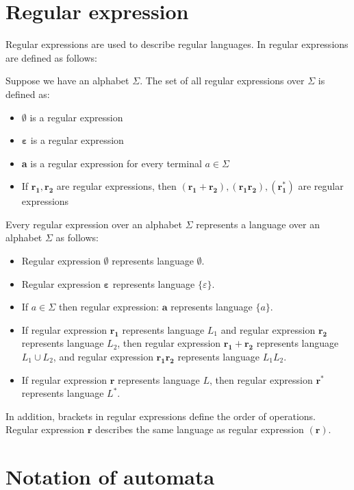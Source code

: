 \documentclass{ctuthesis}
\begin{document}
\section{Regular expression}
\label{sec:regex-def}
Regular expressions are used to describe regular languages. In \cite{demlova} regular expressions are defined as follows:

Suppose we have an alphabet $\Sigma$. The set of all regular expressions over $\Sigma$ is defined as:
\begin{itemize}
	\item $\mathbf{\emptyset}$ is a regular expression
	\item $\mathbf{\varepsilon}$ is a regular expression
	\item \textbf{a} is a regular expression for every terminal $a \in \Sigma$
	\item If $\mathbf{r_1}, \mathbf{r_2}$ are regular expressions, then $(\mathbf{r_1+r_2}), (\mathbf{r_1r_2}), (\mathbf{r_1^*})$ are regular expressions
\end{itemize}

Every regular expression over an alphabet $\Sigma$ represents a language over an alphabet $\Sigma$ as follows: 
\begin{itemize}
	\item Regular expression $\boldsymbol{\emptyset}$ represents language $\emptyset$.
	\item Regular expression $\boldsymbol{\varepsilon}$ represents language $\{\varepsilon\}$.
	\item If $a \in \Sigma$ then regular expression: $\mathbf{a}$ represents language $\{a\}$.
	\item If regular expression $\mathbf{r_1}$ represents language $L_1$ and regular expression $\mathbf{r_2}$ represents language $L_2$, then regular expression $\mathbf{r_1 + r_2}$ represents language $L_1 \cup L_2$, and regular expression $\mathbf{r_1r_2}$ represents language $L_1L_2$.
	\item If regular expression $\mathbf{r}$ represents language $L$, then regular expression $\mathbf{r^*}$ represents language $L^*$.
\end{itemize}

In addition, brackets in regular expressions define the order of operations. Regular expression $\mathbf{r}$ describes the same language as regular expression $\mathbf{(r)}$. 

\section{Notation of automata}
\end{document}
